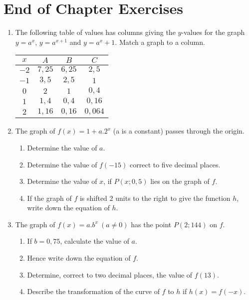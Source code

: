 \section{End of Chapter Exercises}
\begin{enumerate}
\item{The following table of values has columns giving the $y$-values for the graph $y = a^x$, $y = a ^{x+1}$  and $y = a^x + 1$.  Match a graph to a column.
\begin{center}
\begin{tabular}{|c|c|c|c|}\hline
$x$ & $A$ & $B$ & $C$\\\hline
$-2$ & $7,25$ & $6,25$ & $2,5$\\\hline
$-1$ & $3,5$ & $2,5$ & $1$\\\hline
$0$ & $2$ & $1$ & $0,4$\\\hline
$1$ & $1,4$ & $0,4$ & $0,16$\\\hline
$2$ & $1,16$ & $0,16$ & $0,064$\\\hline
\end{tabular}
\end{center}
}
\item{The graph of $f(x) = 1+ a.2^x$ (a is a constant) passes through the origin.}{
\begin{enumerate}
 \item{Determine the value of $a$.}
 \item{Determine the value of $f(-15)$ correct to five decimal places.}
 \item{Determine the value of $x$, if $P(x; 0,5)$ lies on the graph of $f$.}
 \item{If the graph of $f$ is shifted $2$ units to the right to give the function $h$, write down the equation of $h$.}
  \end{enumerate}}
\item{The graph of $f(x) = a.b^x ~(a \neq 0)$ has the point $P(2;144)$ on $f$.}{
\begin{enumerate}
\item{If $b = 0,75$, calculate the value of $a$.}
\item{Hence write down the equation of $f$.}
\item{Determine, correct to two decimal places, the value of $f(13)$.}
\item{Describe the transformation of the curve of $f$ to $h$ if $h(x) = f(-x)$.}
\end{enumerate}}
\end{enumerate}







